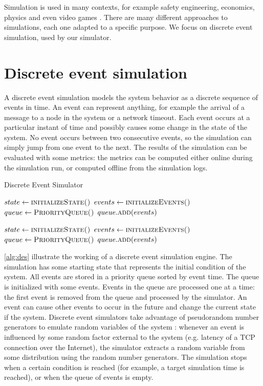 \medskip
Simulation is used in many contexts, for example safety engineering, economics, physics and even video games \cite{wikipedia_simulation}.
There are many different approaches to simulations, each one adapted to a specific purpose.
We focus on discrete event simulation, used by our simulator.


\section{Discrete event simulation}
A discrete event simulation models the system behavior as a discrete sequence of events in time.
An event can represent anything, for example the arrival of a message to a node in the system or a network timeout.
Each event occurs at a particular instant of time and possibly causes some change in the state of the system.
No event occurs between two consecutive events, so the simulation can simply jump from one event to the next.
The results of the simulation can be evaluated with some metrics:
the metrics can be computed either online during the simulation run, or computed offline from the simulation logs.

\medskip
\begin{algorithm}
	\caption{Discrete Event Simulator}
	\label{alg:des}
	\begin{algorithmic}
		\State $state \leftarrow \Call{initializeState()}{}$
		\State $events \leftarrow \Call{initializeEvents()}{}$
		\State $queue \leftarrow \Call{PriorityQueue()}{}$
		\State $queue.\Call{add}{events}$


		\State $state \leftarrow \Call{initializeState()}{}$
		\State $events \leftarrow \Call{initializeEvents()}{}$
		\State $queue \leftarrow \Call{PriorityQueue()}{}$
		\State $queue.\Call{add}{events}$
	\end{algorithmic}
\end{algorithm}
\smallskip

\cref{alg:des} illustrate the working of a discrete event simulation engine.
The simulation has some starting state that represents the initial condition of the system.
All events are stored in a priority queue sorted by event time.
The queue is initialized with some events.
Events in the queue are processed one at a time:
the first event is removed from the queue and processed by the simulator.
An event can cause other events to occur in the future and change the current state if the system.
Discrete event simulators take advantage of pseudorandom number generators to emulate random variables of the system \cite{wikipedia_des}:
whenever an event is influenced by some random factor external to the system (e.g. latency of a TCP connection over the Internet), the simulator extracts a random variable from some distribution using the random number generators.
The simulation stops when a certain condition is reached (for example, a target simulation time is reached), or when the queue of events is empty.

